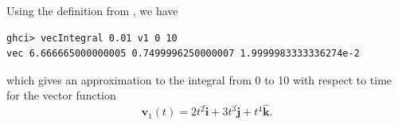 Using the definition from , we have

\begin{lstlisting}
ghci> vecIntegral 0.01 v1 0 10
vec 6.666665000000005 0.7499996250000007 1.9999983333336274e-2
\end{lstlisting}
which gives an approximation to the integral from 0 to 10 with respect
to time for the vector function
\[
    \mathbf{v}_1(t) = 2t^2\hat{\mathbf{i}} + 3t^3\hat{\mathbf{j}}
    + t^4 \hat{\mathbf{k}}.
\]
